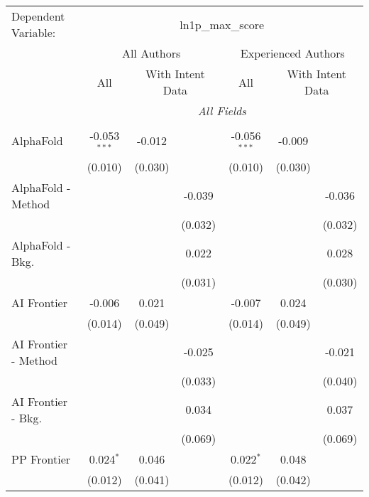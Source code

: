 \begingroup
\centering
\begin{tabular}{lcccccc}
   \tabularnewline \midrule \midrule
   Dependent Variable: & \multicolumn{6}{c}{ln1p\_max\_score}\\
 & \multicolumn{3}{c}{All Authors} & \multicolumn{3}{c}{Experienced Authors} \\
\cmidrule(lr){2-4} \cmidrule(lr){5-7}
 & \multicolumn{1}{c}{All} & \multicolumn{2}{c}{With Intent Data} & \multicolumn{1}{c}{All} & \multicolumn{2}{c}{With Intent Data} \\
\cmidrule(lr){2-2} \cmidrule(lr){3-4} \cmidrule(lr){5-5} \cmidrule(lr){6-7}
 & \multicolumn{6}{c}{\textit{All Fields}} \\ \\
   AlphaFold            & -0.053$^{***}$ & -0.012  &         & -0.056$^{***}$ & -0.009  &   \\   
                        & (0.010)        & (0.030) &         & (0.010)        & (0.030) &   \\   
   AlphaFold - Method   &                &         & -0.039  &                &         & -0.036\\   
                        &                &         & (0.032) &                &         & (0.032)\\   
   AlphaFold - Bkg.     &                &         & 0.022   &                &         & 0.028\\   
                        &                &         & (0.031) &                &         & (0.030)\\   
   AI Frontier          & -0.006         & 0.021   &         & -0.007         & 0.024   &   \\   
                        & (0.014)        & (0.049) &         & (0.014)        & (0.049) &   \\   
   AI Frontier - Method &                &         & -0.025  &                &         & -0.021\\   
                        &                &         & (0.033) &                &         & (0.040)\\   
   AI Frontier - Bkg.   &                &         & 0.034   &                &         & 0.037\\   
                        &                &         & (0.069) &                &         & (0.069)\\   
   PP Frontier          & 0.024$^{*}$    & 0.046   &         & 0.022$^{*}$    & 0.048   &   \\   
                        & (0.012)        & (0.041) &         & (0.012)        & (0.042) &   \\   

\end{tabular}
